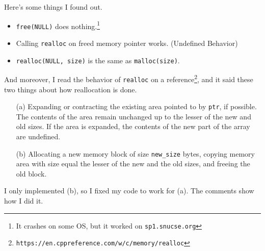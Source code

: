 \documentclass[12pt]{report}
\begin{document}
Here's some things I found out.
\begin{itemize}
	\item \texttt{free(NULL)} does nothing.\footnote{It crashes on some OS, but it worked on \texttt{sp1.snucse.org}}
	\item Calling \texttt{realloc} on freed memory pointer works. (Undefined Behavior)
	\item \texttt{realloc(NULL, size)} is the same as \texttt{malloc(size)}.
\end{itemize}
And moreover, I read the behavior of \texttt{realloc} on a reference\footnote{\texttt{https://en.cppreference.com/w/c/memory/realloc}}, and it said these two things about how reallocation is done.
\begin{itemize}
	\item[(a)] Expanding or contracting the existing area pointed to by \texttt{ptr}, if possible. The contents of the area remain unchanged up to the lesser of the new and old sizes. If the area is expanded, the contents of the new part of the array are undefined.
	\item[(b)] Allocating a new memory block of size \texttt{new\_size} bytes, copying memory area with size equal the lesser of the new and the old sizes, and freeing the old block.
\end{itemize}
I only implemented (b), so I fixed my code to work for (a). The comments show how I did it.
\end{document}
